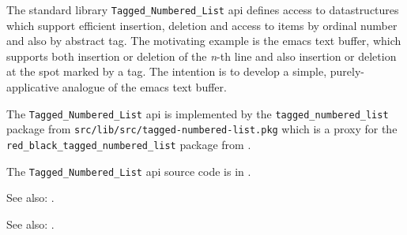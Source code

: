 
The standard library {\tt Tagged\_Numbered\_List} api defines access to datastructures 
which support efficient insertion, deletion and access to items by ordinal number and 
also by abstract tag.  The motivating example is the emacs text buffer, which supports 
both insertion or deletion of the {\it n}-th line and also insertion or deletion at 
the spot marked by a tag.  The intention is to develop a simple, purely-applicative 
analogue of the emacs text buffer.

The {\tt Tagged\_Numbered\_List} api is implemented by the 
{\tt tagged\_numbered\_list} package from 
{\tt src/lib/src/tagged-numbered-list.pkg} 
which is a proxy for the 
{\tt red\_black\_tagged\_numbered\_list} package from 
.

The {\tt Tagged\_Numbered\_List} api source code is in .

See also: .

See also: .

